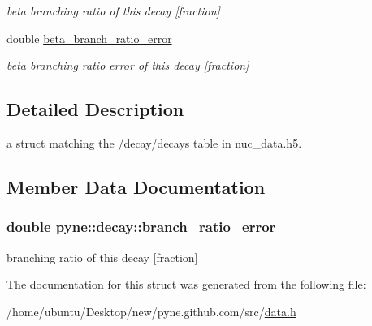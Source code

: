\begin{DoxyCompactItemize}
\begin{DoxyCompactList}\small\item\em beta branching ratio of this decay \mbox{[}fraction\mbox{]} \end{DoxyCompactList}\item 
double \hyperlink{structpyne_1_1decay_afe2d8be6a39ee1dd7045a1970451f04e}{beta\+\_\+branch\+\_\+ratio\+\_\+error}\hypertarget{structpyne_1_1decay_afe2d8be6a39ee1dd7045a1970451f04e}{}\label{structpyne_1_1decay_afe2d8be6a39ee1dd7045a1970451f04e}

\begin{DoxyCompactList}\small\item\em beta branching ratio error of this decay \mbox{[}fraction\mbox{]} \end{DoxyCompactList}\end{DoxyCompactItemize}


\subsection{Detailed Description}
a struct matching the \textquotesingle{}/decay/decays\textquotesingle{} table in nuc\+\_\+data.\+h5. 

\subsection{Member Data Documentation}
\subsubsection[{\texorpdfstring{branch\+\_\+ratio\+\_\+error}{branch_ratio_error}}]{\setlength{\rightskip}{0pt plus 5cm}double pyne\+::decay\+::branch\+\_\+ratio\+\_\+error}\hypertarget{structpyne_1_1decay_a6df2be5724d68bfe566b53fa71320812}{}\label{structpyne_1_1decay_a6df2be5724d68bfe566b53fa71320812}
branching ratio of this decay \mbox{[}fraction\mbox{]} 

The documentation for this struct was generated from the following file\+:\begin{DoxyCompactItemize}
\item 
/home/ubuntu/\+Desktop/new/pyne.\+github.\+com/src/\hyperlink{data_8h}{data.\+h}\end{DoxyCompactItemize}
